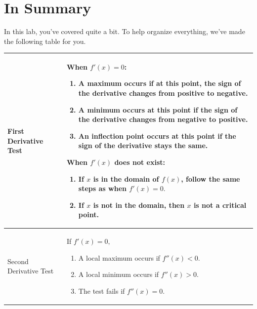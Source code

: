 \documentclass{ximera}
\begin{document}
\section{In Summary}
In this lab, you've covered quite a bit. To help organize everything, we've made the following table for you.


\begin{tabular}{| l | p{7.5cm} |}
\hline
First Derivative Test & When $f'(x) = 0$: \begin{enumerate}
\item{A maximum occurs if at this point, the sign of the derivative changes from positive to negative.}
\item{A minimum occurs at this point if the sign of the derivative changes from negative to positive.}
\item{An inflection point occurs at this point if the sign of the derivative stays the same.}
\end{enumerate}
When $f'(x)$ does not exist:
\begin{enumerate}
\item{If $x$ is in the domain of $f(x)$, follow the same steps as when $f'(x)=0\text{.}$}
\item{If $x$ is not in the domain, then $x$ is not a critical point.}
\end{enumerate}\\
\hline
Second Derivative Test &  \hspace{5mm}If $f'(x)=0\text{,}$ \begin{enumerate}
\item{A local maximum occurs if $f''(x)<0$.}
\item{A local minimum occurs if $f''(x)>0$.}
\item{The test fails if $f''(x)=0$.}
\end{enumerate}\\ \hline
\end{tabular}
\end{document}
